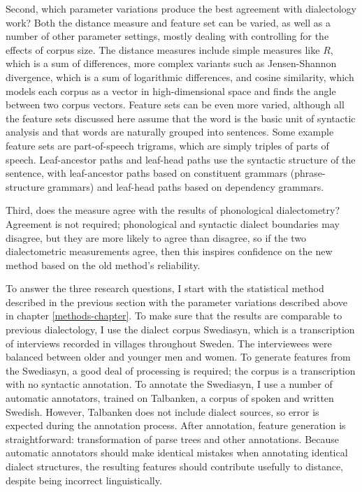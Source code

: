 Second, which parameter variations produce the best agreement with
dialectology work? Both the distance measure and feature set can be
varied, as well as a number of other parameter settings, mostly
dealing with controlling for the effects of corpus size. The distance
measures include simple measures like $R$, which is a sum of differences, more
complex variants such as Jensen-Shannon divergence, which is a sum of
logarithmic differences, and cosine similarity, which models each
corpus as a vector in high-dimensional space and finds the angle
between two corpus vectors. Feature sets can be even more varied,
although all the feature sets discussed here assume that the word is the
basic unit of syntactic analysis and that words are naturally grouped
into sentences. Some example feature sets are part-of-speech trigrams,
which are simply triples of parts of speech. Leaf-ancestor paths and
leaf-head paths use the syntactic structure of the sentence, with
leaf-ancestor paths based on constituent grammars (phrase-structure
grammars) and leaf-head paths based on dependency grammars.

Third, does the measure agree with the results of phonological
dialectometry? Agreement is not required; phonological and syntactic
dialect boundaries may disagree, but they are more likely to agree
than disagree, so if the two dialectometric measurements agree, then
this inspires confidence on the new method based on the old method's
reliability.

To answer the three research questions, I start with the statistical
method described in the previous section with the parameter variations
described above in chapter \ref{methods-chapter}. To make sure that
the results are comparable to previous dialectology, I use the dialect
corpus Swediasyn, which is a transcription of interviews recorded
in villages throughout Sweden. The interviewees were balanced
between older and younger men and women. To generate features from the
Swediasyn, a good deal of processing is required; the corpus is a
transcription with no syntactic annotation. To annotate the Swediasyn,
I use a number of automatic annotators, trained on Talbanken, a corpus
of spoken and written Swedish. However, Talbanken does not include
dialect sources, so error is expected during the
annotation process. After annotation, feature generation is
straightforward: transformation of parse trees and other
annotations. Because automatic annotators should make identical
mistakes when annotating identical dialect structures, the resulting
features should contribute usefully to distance, despite being
incorrect linguistically.

